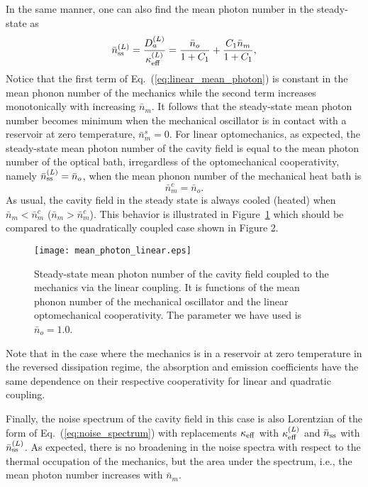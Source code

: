 \documentclass[pra,aps,showpacs,twocolumn,floatfix, superscriptaddress, nofootinbib, nobibnotes]{revtex4-1}
\begin{document}
In the same manner, one can also find the mean photon number in the steady-state as
\begin{equation}
  \bar n_{\rm ss}^{(L)} = \frac{D_a^{(L)}}{\kappa_{\rm eff}^{(L)}}=\frac{\bar n_o }{1+C_1}+\frac{C_1\bar n_m}{1+C_1},
  \label{eq:linear_mean_photon}
\end{equation}
Notice that the first term of Eq.~(\ref{eq:linear_mean_photon}) is constant in the mean phonon number of the mechanics while the second term increases monotonically with increasing $\bar n_m$. It follows that the steady-state mean photon number becomes minimum when the mechanical oscillator is in contact with a reservoir at zero temperature, $\bar n_m^s=0$. 
For linear optomechanics, as expected, the steady-state mean photon number of the cavity field is equal to the mean photon number of the optical bath, irregardless of the optomechanical cooperativity, namely $\bar n_{\rm ss}^{(L)}=\bar n_o$, when the mean phonon number of the mechanical heat bath is
\begin{equation}
 \bar n_{m}^{c} = \bar n_o.
 \label{eq:critical_number2}
\end{equation}
 As usual, the cavity field in the steady state is always cooled (heated) when  $\bar n_m<\bar n_{m}^{c}$ ($\bar n_m>\bar n_{m}^{c}$). This behavior is illustrated in Figure~\ref{fig:Mean_photon_number_linear} which should be compared to the quadratically coupled case shown in Figure 2.
\begin{figure}[]
\texttt{[image: mean\_photon\_linear.eps]}
\caption{Steady-state mean photon number of the cavity field coupled to the mechanics via the linear coupling. It is functions of the mean phonon number of the mechanical oscillator and the linear optomechanical cooperativity. The parameter we have used is $\bar n_o=1.0$.}
\label{fig:Mean_photon_number_linear}
\end{figure}
Note that in the case where the mechanics is in a reservoir at zero temperature in the reversed dissipation regime, the absorption and emission coefficients have the same dependence on their respective cooperativity for linear and quadratic coupling. 

Finally, the noise spectrum of the cavity field in this case is also Lorentzian of the form of Eq.~(\ref{eq:noise_spectrum}) with replacements $\kappa_{\rm eff}$ with $\kappa_{\rm eff}^{(L)}$ and $\bar n_{\rm ss}$ with $\bar n_{\rm ss}^{(L)}$. As expected, there is no broadening in the noise spectra with respect to the thermal occupation of the mechanics, but the area under the spectrum, i.e., the mean photon number increases with $\bar n_m$. 
\end{document}
